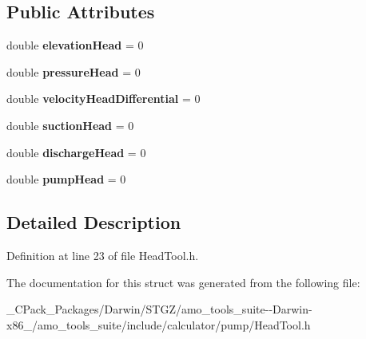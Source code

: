 \subsection*{Public Attributes}
\begin{DoxyCompactItemize}
\item 
\mbox{\label{struct_head_tool_base_1_1_output_a7b81653cfa3cc8b070edf69e02ca8b67}} 
double {\bfseries elevation\+Head} = 0
\item 
\mbox{\label{struct_head_tool_base_1_1_output_a5e2dc1c9888e1f9d85d74e66d71b36d3}} 
double {\bfseries pressure\+Head} = 0
\item 
\mbox{\label{struct_head_tool_base_1_1_output_ac48d39312b19d3b081effc6d4af65981}} 
double {\bfseries velocity\+Head\+Differential} = 0
\item 
\mbox{\label{struct_head_tool_base_1_1_output_a7e5d1f527cab458415f22e1929fe4a45}} 
double {\bfseries suction\+Head} = 0
\item 
\mbox{\label{struct_head_tool_base_1_1_output_a1796e4ee426292790cc7c5b7731eeff9}} 
double {\bfseries discharge\+Head} = 0
\item 
\mbox{\label{struct_head_tool_base_1_1_output_ad5d02c438e5044769aab764a10298cf2}} 
double {\bfseries pump\+Head} = 0
\end{DoxyCompactItemize}


\subsection{Detailed Description}


Definition at line 23 of file Head\+Tool.\+h.



The documentation for this struct was generated from the following file\+:\begin{DoxyCompactItemize}
\item 
\+\_\+\+C\+Pack\+\_\+\+Packages/\+Darwin/\+S\+T\+G\+Z/amo\+\_\+tools\+\_\+suite-\/-\/\+Darwin-\/x86\+\_/amo\+\_\+tools\+\_\+suite/include/calculator/pump/Head\+Tool.\+h\end{DoxyCompactItemize}

